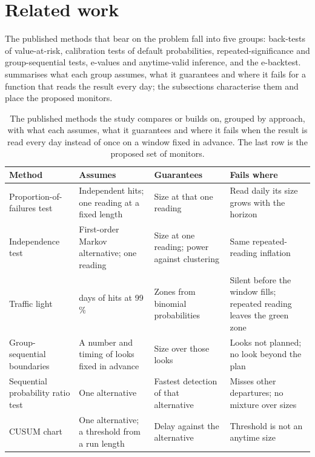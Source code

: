 \section{Related work}
\label{sec:related-work}

The published methods that bear on the problem fall into five groups: back-tests of value-at-risk, calibration tests of default probabilities, repeated-significance
and group-sequential tests, e-values and anytime-valid inference, and the e-backtest.  summarises what each group assumes, what it guarantees and where it fails
for a function that reads the result every day; the subsections characterise them and place the proposed monitors.

\begin{table}[htbp]
\centering
\small
\caption{The published methods the study compares or builds on, grouped by approach, with what each assumes, what it guarantees and where it fails when the result is read every day instead of once on a
window fixed in advance. The last row is the proposed set of monitors.}
\label{tab:related}
\begin{tabularx}{\textwidth}{>{\raggedright\arraybackslash}p{3.3cm}>{\raggedright\arraybackslash}X>{\raggedright\arraybackslash}X>{\raggedright\arraybackslash}X}
\toprule
Method & Assumes & Guarantees & Fails where \\
\midrule
Proportion-of-failures test \citep{kupiec1995} & Independent hits; one reading at a fixed length & Size at that one reading & Read daily its size grows with the horizon \\
Independence test \citep{christoffersen1998} & First-order Markov alternative; one reading & Size at one reading; power against clustering & Same repeated-reading inflation \\
Traffic light \citep{bcbs1996,bcbs2019} & 250 days of hits at 99\,\% & Zones from binomial probabilities & Silent before the window fills; repeated reading leaves the green zone \\
Group-sequential boundaries \citep{pocock1977,obrien1979,lan1983} & A number and timing of looks fixed in advance & Size over those looks & Looks not planned; no look beyond the plan \\
Sequential probability ratio test \citep{wald1945} & One alternative & Fastest detection of that alternative & Misses other departures; no mixture over sizes \\
CUSUM chart \citep{page1954} & One alternative; a threshold from a run length & Delay against the alternative & Threshold is not an anytime size \\

\end{tabularx}
\end{table}
